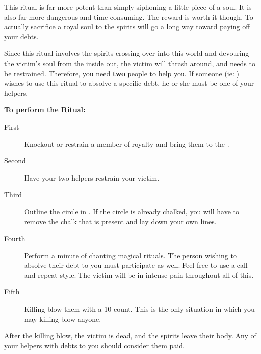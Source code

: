 \documentclass[green]{NeptuneBall}
\begin{document}
\name{\gRitual{}}

This ritual is far more potent than simply siphoning a little piece of a soul. It is also far more dangerous and time consuming. The reward is worth it though. To actually sacrifice a royal soul to the spirits will go a long way toward paying off your debts.

Since this ritual involves the spirits crossing over into this world and devouring the victim's soul from the inside out, the victim will thrash around, and needs to be restrained. Therefore, you need {\bf two} people to help you. If someone (ie: \cAriel{}) wishes to use this ritual to absolve a specific debt, he or she must be one of your helpers.

{\bf To perform the Ritual:}
\begin{description}
\item[First] Knockout or restrain a member of royalty and bring them to the \sRunicCircle{}.
\item[Second] Have your two helpers restrain your victim.
\item [Third] Outline the circle in \iChalk{\MYname}. If the circle is already chalked, you will have to remove the chalk that is present and lay down your own lines.
\item[Fourth] Perform a minute of chanting magical rituals. The person wishing to absolve their debt to you must participate as well. Feel free to use a call and repeat style. The victim will be in intense pain throughout all of this.
\item[Fifth] Killing blow them with a 10 count. This is the only situation in which you may killing blow anyone.
\end{description}

After the killing blow, the victim is dead, and the spirits leave their body. Any of your helpers with debts to you should consider them paid.
\end{document}

